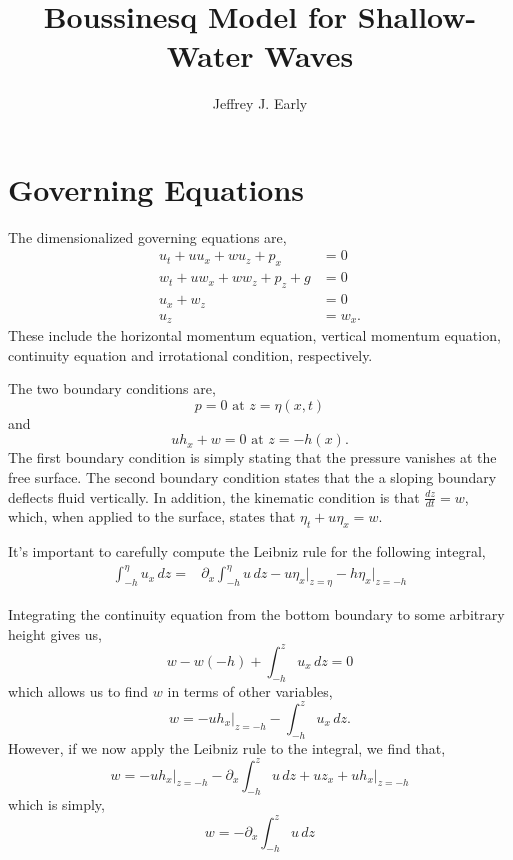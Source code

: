 \documentclass[11pt]{article}
\title{Boussinesq Model for Shallow-Water Waves}
\author{Jeffrey J. Early}
\begin{document}
\maketitle
\section{Governing Equations}
The dimensionalized governing equations are,
\begin{align}
u_t + u u_x + w u_z + p_x &=0 \\
w_t+ u w_x + w w_z + p_z + g &=0 \\
u_x + w_z &= 0 \\
u_z &= w_x.
\end{align}
These include the horizontal momentum equation, vertical momentum equation, continuity equation and irrotational condition, respectively.

The two boundary conditions are,
\[
p = 0 \textrm{ at } z=\eta(x,t)
\]
and
\[
u h_x + w = 0 \textrm{ at } z=-h(x).
\]
The first boundary condition is simply stating that the pressure vanishes at the free surface. The second boundary condition states that the a sloping boundary deflects fluid vertically. In addition, the kinematic condition is that $\frac{dz}{dt}=w$, which, when applied to the surface, states that $\eta_t + u \eta_x = w$.

It's important to carefully compute the Leibniz rule for the following integral,
\begin{align}
\int_{-h}^{\eta} u_x \, dz =& \partial_x \int_{-h}^{\eta} u \, dz - u \eta_x\bigg|_{z=\eta} - h \eta_x\bigg|_{z=-h}
\end{align}

Integrating the continuity equation from the bottom boundary to some arbitrary height gives us,
\begin{equation}
w - w(-h) + \int_{-h}^{z} u_x \, dz = 0
\end{equation}
which allows us to find $w$ in terms of other variables,
\begin{equation}
w = -uh_x\bigg|_{z=-h} - \int_{-h}^{z} u_x \, dz.
\end{equation}
However, if we now apply the Leibniz rule to the integral, we find that,
\begin{equation}
w = -uh_x\bigg|_{z=-h} - \partial_x \int_{-h}^{z} u \, dz + uz_x + uh_x\bigg|_{z=-h}
\end{equation}
which is simply,
\begin{equation}
w = - \partial_x \int_{-h}^{z} u \, dz 
\end{equation}
\end{document}
